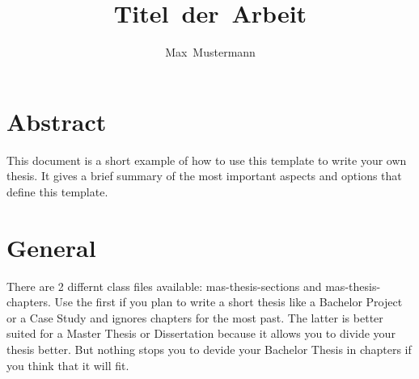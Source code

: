 \documentclass[masterarbeit,grey]{mas-thesis-sections}				%
\author{Max~Mustermann}						%
\title{Titel~der~Arbeit}
\begin{document}
\maketitle				%

%
%
\makelicensepageCCBYSA

\cleardoublepage


\eidesstattlicheErklaerung

\tableofcontents		%

\cleardoublepage

\listofillustrations	%


\cleardoublepage

\setcounter{page}{1}


% 
% 
% 
% 
% 
% 


\section{Abstract}

This document is a short example of how to use this template to write your own thesis. It gives a brief summary of the most important aspects and options that define this template.

\newpage


\section{General}

There are 2 differnt class files available: mas-thesis-sections and mas-thesis-chapters. Use the first if you plan to write a short thesis like a Bachelor Project or a Case Study and ignores chapters for the most past. The latter is better suited for a Master Thesis or Dissertation because it allows you to divide your thesis better. But nothing stops you to devide your Bachelor Thesis in chapters if you think that it will fit.
\end{document}
